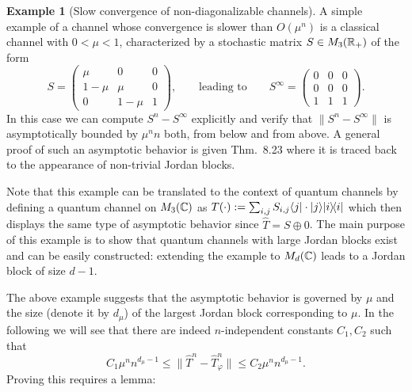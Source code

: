 \documentclass[11pt,a4paper]{article}
\theoremstyle{plain}
\theoremstyle{definition}
\newtheorem{example}{Example}[section]
\theoremstyle{remark}
\begin{document}
\begin{example}[Slow convergence of non-diagonalizable channels]
    A simple example of a channel whose convergence is slower than $O(\mu^n)$ is a classical channel with $0<\mu<1$, characterized by a stochastic matrix $S\in M_3(\mathbb{R}_+)$ of the form
    \begin{equation}\tag{8.101}
        S=
        \begin{pmatrix}
            \mu   &0     &0\\
            1-\mu &\mu   &0\\
            0     &1-\mu &1
        \end{pmatrix},
        \qquad\text{leading to}\qquad
        S^\infty =
        \begin{pmatrix}
            0 &0 &0\\
            0 &0 &0\\
            1 &1 &1
        \end{pmatrix}.
    \end{equation}
    In this case we can compute $S^n-S^\infty$ explicitly and verify that $\|S^n-S^\infty\|$ is asymptotically bounded by $\mu^n n$ both, from below and from above.
    A general proof of such an asymptotic behavior is given Thm.~8.23 where it is traced back to the appearance of non-trivial Jordan blocks.

    Note that this example can be translated to the context of quantum channels by defining a quantum channel on $M_3(\mathbb{C})$ as
    $T(\cdot):=\sum_{i,j} S_{i,j}\langle j|\cdot|j\rangle |i\rangle\!\langle i|$ which then displays the same type of asymptotic behavior since $\hat{T}=S\oplus 0$.
    The main purpose of this example is to show that quantum channels with large Jordan blocks exist and can be easily constructed: extending the example to $M_d(\mathbb{C})$ leads to a Jordan block of size $d-1$.
\end{example}

The above example suggests that the asymptotic behavior is governed by $\mu$ and the size (denote it by $d_\mu$) of the largest Jordan block corresponding to $\mu$.
In the following we will see that there are indeed $n$-independent constants $C_1,C_2$ such that
\begin{equation}\tag{8.102}
    C_1\mu^n n^{d_\mu-1} \le \|\hat{T}^n-\hat{T}_\varphi^n\| \le C_2\mu^n n^{d_\mu-1}.
\end{equation}
Proving this requires a lemma:
\end{document}
